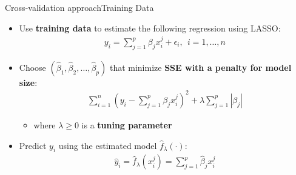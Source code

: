 \documentclass[hyperref={pdfpagelabels=false}]{beamer}
\begin{document}
\begin{frame}{Cross-validation approach}{Training Data}
    \begin{itemize}
        \item Use \textbf{training data} to estimate the following 
        regression using LASSO:
        \begin{eqnarray*}
            y_{i} = \sum^{p}_{j=1} \beta_{j} x^{j}_{i} + \epsilon_{i}, 
            \ \ i=1, \ldots, n
        \end{eqnarray*}
        \vspace{0.1cm}
        \item Choose $(\hat{\beta}_{1}, \hat{\beta}_{2}, \ldots, \hat{\beta}_{p})$ 
        that minimize \textbf{SSE with a penalty for model size}:
        \begin{eqnarray*}
            \sum^{n}_{i=1} \left(y_{i} - \sum^{p}_{j=1} \beta_{j} 
            x^{j}_{i}\right)^{2} + \lambda \sum^{p}_{j=1} |\beta_{j}|
        \end{eqnarray*}
        \begin{itemize}
            \item where $\lambda \geq 0$ is a \textbf{tuning parameter}
        \end{itemize}
        \vspace{0.2cm}
        \item Predict $y_{i}$ using the estimated model 
        $\hat{f}_{\lambda}(\cdot)$:
        \begin{eqnarray*}
            \hat{y}_{i} = \hat{f}_{\lambda}(x^{j}_{i}) 
            = \sum^{p}_{j=1} \hat{\beta}_{j} x^{j}_{i}
        \end{eqnarray*}
    \end{itemize}
\end{frame}



		
		
\end{document}
